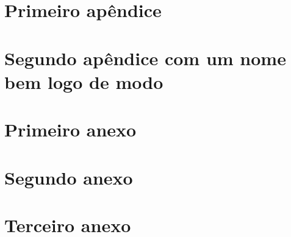 \documentclass[12pt,oneside,a4paper]{abntex2}
\begin{document}
\begin{apendicesenv}

\appendixpage

\chapter{Primeiro apêndice}

\lipsum[50-52]

\chapter{Segundo apêndice com um nome bem logo de modo}
\lipsum[55-57]
\end{apendicesenv}


\begin{anexosenv}
% 

\appendixpage

\chapter{Primeiro anexo}
\lipsum[200-202]

\chapter{Segundo anexo}

\lipsum[210-212]

\chapter{Terceiro anexo}

\lipsum[213-214]

\end{anexosenv}



\printindex
\end{document}

